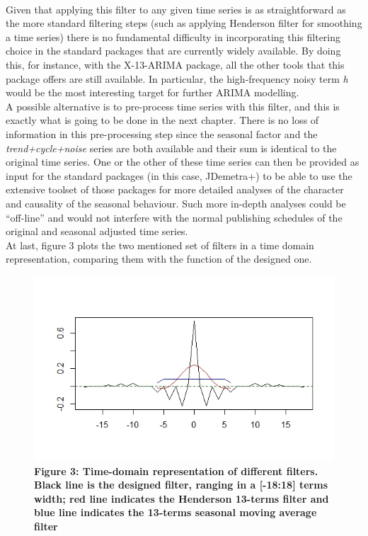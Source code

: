 \documentclass{article}
\begin{document}
\\Given that applying this filter to any given time series is as straightforward as the more standard filtering steps (such as applying Henderson filter for smoothing a time series) there is no fundamental difficulty in incorporating this filtering choice in the standard packages that are currently widely available. By doing this, for instance, with the X-13-ARIMA package, all the other tools that this package offers are still available. In particular, the high-frequency noisy term \textit{h} would be the most interesting target for further ARIMA modelling. \\A possible alternative is to pre-process time series with this filter, and this is exactly what is going to be done in the next chapter. There is no loss of information in this pre-processing step since the seasonal factor and the \textit{trend+cycle+noise} series are both available and their sum is identical to the original time series. One or the other of these time series can then be provided as input for the standard packages (in this case, JDemetra+) to be able to use the extensive toolset of those packages for more detailed analyses of the character and causality of the seasonal behaviour. Such more in-depth analyses could be ``off-line'' and would not interfere with the normal publishing schedules of the original and seasonal adjusted time series.\\
At last, figure 3 plots the two mentioned set of filters in a time domain representation, comparing them with the function of the designed one.
 \begin{figure}[H]
  \includegraphics[width=\linewidth]{../images/capitolo2/henderson_designed_ma.jpeg}
  {\textbf{\scriptsize Figure 3: Time-domain representation of different filters. Black line is the designed filter, ranging in a [-18:18] terms width; red line indicates the Henderson 13-terms filter and blue line indicates the 13-terms seasonal moving average filter}}
\end{figure}
\end{document}

